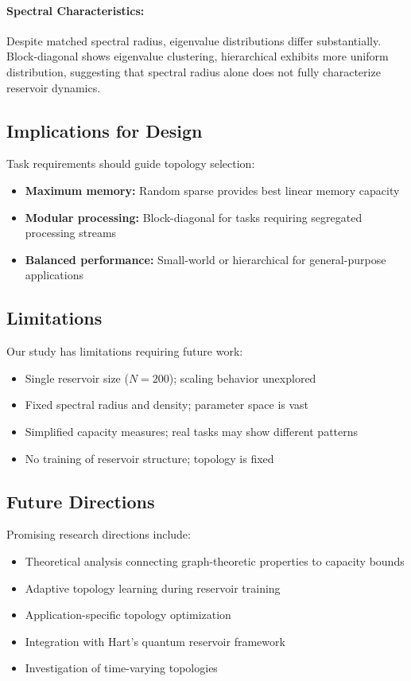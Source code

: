 \documentclass[11pt]{article}
\begin{document}
\paragraph{Spectral Characteristics:} Despite matched spectral radius, eigenvalue distributions differ substantially. Block-diagonal shows eigenvalue clustering, hierarchical exhibits more uniform distribution, suggesting that spectral radius alone does not fully characterize reservoir dynamics.

\subsection{Implications for Design}

Task requirements should guide topology selection:

\begin{itemize}
\item \textbf{Maximum memory:} Random sparse provides best linear memory capacity
\item \textbf{Modular processing:} Block-diagonal for tasks requiring segregated processing streams
\item \textbf{Balanced performance:} Small-world or hierarchical for general-purpose applications
\end{itemize}

\subsection{Limitations}

Our study has limitations requiring future work:

\begin{itemize}
\item Single reservoir size ($N=200$); scaling behavior unexplored
\item Fixed spectral radius and density; parameter space is vast
\item Simplified capacity measures; real tasks may show different patterns
\item No training of reservoir structure; topology is fixed
\end{itemize}

\subsection{Future Directions}

Promising research directions include:

\begin{itemize}
\item Theoretical analysis connecting graph-theoretic properties to capacity bounds
\item Adaptive topology learning during reservoir training
\item Application-specific topology optimization
\item Integration with Hart's quantum reservoir framework \citep{hart2024quantum}
\item Investigation of time-varying topologies
\end{itemize}
\end{document}
